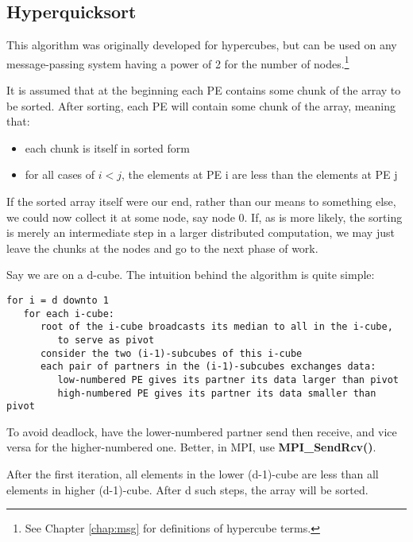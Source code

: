 \subsection{Hyperquicksort}

This algorithm was originally developed for hypercubes, but can be used
on any message-passing system having a power of 2 for the number of
nodes.\footnote{See Chapter \ref{chap:msg} for definitions of
hypercube terms.}

It is assumed that at the beginning each PE contains some chunk of the
array to be sorted. After sorting, each PE will contain some chunk of
the  array, meaning that:

\begin{itemize}

\item each chunk is itself in sorted form

\item for all cases of \( i<j \), the elements at PE i are less than the
elements at PE j

\end{itemize}

If the sorted array itself were our end, rather than our means to
something else, we could now collect it at some node, say node 0.
If, as is more likely, the sorting is merely an intermediate step in a
larger distributed computation, we may just leave the chunks at the
nodes and go to the next phase of work.

Say we are on a d-cube.  The intuition behind the algorithm is quite
simple:

\begin{Verbatim}[fontsize=\relsize{-2}]
for i = d downto 1
   for each i-cube:
      root of the i-cube broadcasts its median to all in the i-cube, 
         to serve as pivot
      consider the two (i-1)-subcubes of this i-cube
      each pair of partners in the (i-1)-subcubes exchanges data:
         low-numbered PE gives its partner its data larger than pivot
         high-numbered PE gives its partner its data smaller than pivot
\end{Verbatim}

To avoid deadlock, have the lower-numbered partner send then receive,
and vice versa for the higher-numbered one.  Better, in MPI, use {\bf
MPI\_SendRcv()}.

After the first iteration, all elements in the lower (d-1)-cube are less
than all elements in higher (d-1)-cube.  After d such steps, the array
will be sorted.

